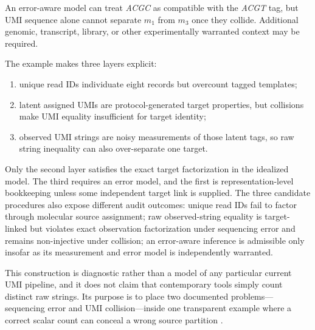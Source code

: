\documentclass[12pt]{article}
\begin{document}
An error-aware model can treat \emph{ACGC} as compatible with the \emph{ACGT} tag, but UMI sequence alone cannot separate \(m_1\) from \(m_3\) once they collide. Additional genomic, transcript, library, or other experimentally warranted context may be required.

The example makes three layers explicit:

\begin{enumerate}[leftmargin=*]
\item unique read IDs individuate eight records but overcount tagged templates;
\item latent assigned UMIs are protocol-generated target properties, but collisions make UMI equality insufficient for target identity;
\item observed UMI strings are noisy measurements of those latent tags, so raw string inequality can also over-separate one target.
\end{enumerate}

Only the second layer satisfies the exact target factorization in the idealized model. The third requires an error model, and the first is representation-level bookkeeping unless some independent target link is supplied. The three candidate procedures also expose different audit outcomes: unique read IDs fail to factor through molecular source assignment; raw observed-string equality is target-linked but violates exact observation factorization under sequencing error and remains non-injective under collision; an error-aware inference is admissible only insofar as its measurement and error model is independently warranted.

This construction is diagnostic rather than a model of any particular current UMI pipeline, and it does not claim that contemporary tools simply count distinct raw strings. Its purpose is to place two documented problems---sequencing error and UMI collision---inside one transparent example where a correct scalar count can conceal a wrong source partition \citep{Kivioja2012UMI,SmithHegerSudbery2017UMITools}.
\end{document}
